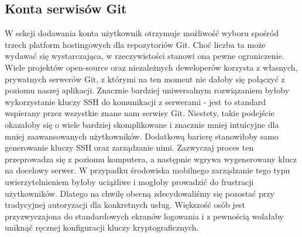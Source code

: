 \subsection{Konta serwisów Git}\label{sec:git_accounts}
W sekcji dodawania konta użytkownik otrzymuje możliwość wyboru spośród trzech platform hostingowych dla repozytoriów Git. Choć liczba ta może wydawać się wystarczająca, w rzeczywistości stanowi ona pewne ograniczenie. Wiele projektów open-source oraz niezależnych deweloperów korzysta z własnych, prywatnych serwerów Git, z którymi na ten moment nie dałoby się połączyć z poziomu naszej aplikacji.
\newline\newline
Znacznie bardziej uniwersalnym rozwiązaniem byłoby wykorzystanie kluczy SSH do komunikacji z serwerami - jest to standard wspierany przez wszystkie znane nam serwisy Git. Niestety, takie podejście okazałoby się o wiele bardziej skomplikowane i znacznie mniej intuicyjne dla mniej zaawansowanych użytkowników.
\newline\newline
Dodatkową barierę stanowiłoby samo generowanie kluczy SSH oraz zarządzanie nimi. Zazwyczaj proces ten przeprowadza się z poziomu komputera, a następnie wgrywa wygenerowany klucz na docelowy serwer. W przypadku środowiska mobilnego zarządzanie tego typu uwierzytelnieniem byłoby uciążliwe i mogłoby prowadzić do frustracji użytkowników. Dlatego na chwilę obecną zdecydowaliśmy się pozostać przy tradycyjnej autoryzacji dla konkretnych usług. Większość osób jest przyzwyczajona do standardowych ekranów logowania i z pewnością wolałaby uniknąć ręcznej konfiguracji kluczy kryptograficznych.

